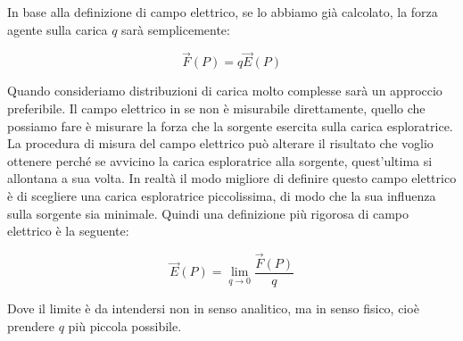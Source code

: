 \begin{figure}[htpb]
\end{figure}
\FloatBarrier

In base alla definizione di campo elettrico, se lo abbiamo già calcolato, la forza agente sulla carica $q$ sarà semplicemente:

\[
	\vec{F} (P) = q\vec{E} (P)
\]

Quando consideriamo distribuzioni di carica molto complesse sarà un approccio preferibile.
Il campo elettrico in se non è misurabile direttamente, quello che possiamo fare è misurare la forza che la sorgente esercita sulla carica esploratrice.
La procedura di misura del campo elettrico può alterare il risultato che voglio ottenere perché se avvicino la carica esploratrice alla sorgente, quest'ultima si allontana a sua volta. In realtà il modo migliore di definire questo campo elettrico è di scegliere una carica esploratrice piccolissima, di modo che la sua influenza sulla sorgente sia minimale. Quindi una definizione più rigorosa di campo elettrico è la seguente:

\[
	\vec{E} (P)=\lim_{q \to 0}\frac{\vec{F} (P)}{q}
\]

Dove il limite è da intendersi non in senso analitico, ma in senso fisico, cioè prendere $q$ più piccola possibile.

